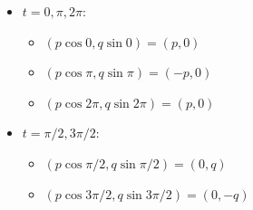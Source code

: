 \begin{problema}
\begin{sol}
        \begin{itemize}
            \item $t=0,\pi,2\pi$:
            \begin{itemize}
                \item $(p \cos 0, q \sin 0)=(p,0)$
                \item $(p \cos \pi, q \sin \pi)=(-p,0)$
                \item $(p \cos 2\pi, q \sin 2\pi)=(p,0)$
            \end{itemize}
            \item $t=\pi/2,3\pi/2$:
            \begin{itemize}
                \item $(p \cos \pi/2, q \sin \pi/2)=(0,q)$
                \item $(p \cos 3\pi/2, q \sin 3\pi/2)=(0,-q)$
            \end{itemize}
        \end{itemize}
    \end{sol}
\end{problema}
%
%

